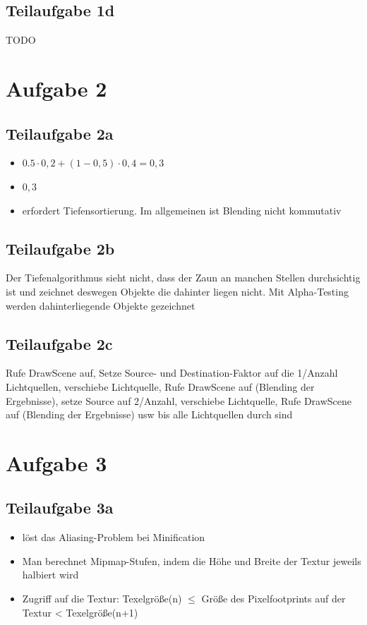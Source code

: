 \documentclass[a4paper]{scrartcl}
\begin{document}
\subsection*{Teilaufgabe 1d}
TODO

\section*{Aufgabe 2}
\subsection*{Teilaufgabe 2a}
\begin{itemize}
    \item $0.5 \cdot 0,2 + (1-0,5) \cdot 0,4 = 0,3$
    \item $0,3$
    \item erfordert Tiefensortierung. Im allgemeinen ist Blending nicht
          kommutativ
\end{itemize}

\subsection*{Teilaufgabe 2b}
Der Tiefenalgorithmus sieht nicht, dass der Zaun an manchen Stellen
durchsichtig ist und zeichnet deswegen Objekte die dahinter liegen nicht. Mit
Alpha-Testing werden dahinterliegende Objekte gezeichnet

\subsection*{Teilaufgabe 2c}
Rufe DrawScene auf, Setze Source- und Destination-Faktor auf die 1/Anzahl
Lichtquellen, verschiebe Lichtquelle, Rufe DrawScene auf (Blending der
Ergebnisse), setze Source auf 2/Anzahl, verschiebe Lichtquelle, Rufe DrawScene
auf (Blending der Ergebnisse) usw bis alle Lichtquellen durch sind

\section*{Aufgabe 3}
\subsection*{Teilaufgabe 3a}
\begin{itemize}
\item löst das Aliasing-Problem bei Minification
\item Man berechnet Mipmap-Stufen, indem die Höhe und Breite der Textur jeweils halbiert wird
\item Zugriff auf die Textur: Texelgröße(n) $\leq$ Größe des Pixelfootprints auf der Textur < Texelgröße(n+1)
\end{itemize}
\end{document}
